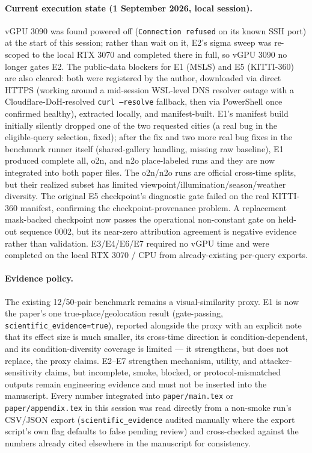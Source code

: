 \documentclass[11pt]{article}
\begin{document}
\paragraph{Current execution state (1 September 2026, local session).} vGPU
3090 was found powered off (\texttt{Connection refused} on its known SSH
port) at the start of this session; rather than wait on it, E2's sigma
sweep was re-scoped to the local RTX 3070 and completed there in full, so
vGPU 3090 no longer gates E2. The public-data blockers for E1 (MSLS) and E5
(KITTI-360) are also cleared: both were registered by the author, downloaded
via direct HTTPS (working around a mid-session WSL-level DNS resolver outage
with a Cloudflare-DoH-resolved \texttt{curl --resolve} fallback, then via
PowerShell once confirmed healthy), extracted locally, and manifest-built.
E1's manifest build initially silently dropped one of the two requested
cities (a real bug in the eligible-query selection, fixed); after the fix
and two more real bug fixes in the benchmark runner itself (shared-gallery
handling, missing raw baseline), E1 produced complete all, o2n, and n2o
place-labeled runs and they are now integrated into both paper files. The
o2n/n2o runs are official cross-time splits, but their realized subset has
limited viewpoint/illumination/season/weather diversity. The original E5
checkpoint's diagnostic gate failed on the real KITTI-360 manifest, confirming
the checkpoint-provenance problem. A replacement mask-backed checkpoint now
passes the operational non-constant gate on held-out sequence 0002, but its
near-zero attribution agreement is negative evidence rather than validation.
E3/E4/E6/E7 required no vGPU time and were completed on
the local RTX 3070 / CPU from already-existing per-query exports.

\paragraph{Evidence policy.} The existing 12/50-pair benchmark remains a
visual-similarity proxy. E1 is now the paper's one true-place/geolocation
result (gate-passing, \texttt{scientific\_evidence=true}), reported alongside
the proxy with an explicit note that its effect size is much smaller, its
cross-time direction is condition-dependent, and its condition-diversity
coverage is limited --- it strengthens, but does not replace, the proxy
claims. E2--E7 strengthen mechanism, utility, and attacker-sensitivity
claims, but incomplete, smoke, blocked, or
protocol-mismatched outputs
remain engineering evidence and must not be inserted into the manuscript.
Every number integrated into \texttt{paper/main.tex} or
\texttt{paper/appendix.tex} in this session was read directly from a
non-smoke run's CSV/JSON export (\texttt{scientific\_evidence} audited
manually where the export script's own flag defaults to false pending
review) and cross-checked against the numbers already cited elsewhere in the
manuscript for consistency.
\end{document}

